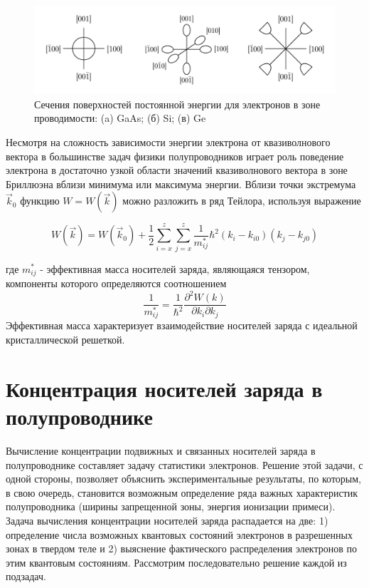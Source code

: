 \begin{figure}[h!]
	\centering
	\includegraphics[width = .95\linewidth]{img/16}
	\caption{Сечения поверхностей постоянной энергии для электронов в зоне проводимости: (a) GaAs; (б) Si; (в) Ge}
	\label{fig:1.6}
\end{figure}

Несмотря на сложность зависимости энергии электрона от квазиволнового вектора в большинстве задач физики полупроводников
играет роль поведение электрона в достаточно узкой области значений квазиволнового вектора в зоне Бриллюэна вблизи
минимума или максимума энергии. Вблизи точки экстремума $\vec{k}_0$ функцию $W=W(\vec{k})$ можно разложить в ряд Тейлора, используя
выражение

\begin{equation}
	W(\vec{k})=W\left(\vec{k}_{0}\right)+\frac{1}{2} \sum_{i=x}^{z} \sum_{j=x}^{z} \frac{1}{m_{i j}^*} \hbar^{2}\left(k_{i}-k_{i 0}\right)\left(k_{j}-k_{j 0}\right)
	\label{eq:1.7}
\end{equation}

где $m_{i j}^*$ - эффективная масса носителей заряда, являющаяся тензором, компоненты которого определяются соотношением
\begin{equation}
	\frac{1}{m^{*}_{i j}}=\frac{1}{\hbar^{2}} \frac{\partial^{2} W(k)}{\partial k_{i} \partial k_{j}}
	\label{eq:1.8}
\end{equation}
Эффективная масса характеризует взаимодействие носителей заряда с идеальной кристаллической решеткой.

\section{Концентрация носителей заряда в полупроводнике}
Вычисление концентрации подвижных и связанных носителей заряда в полупроводнике составляет задачу статистики электронов.
Решение этой задачи, с одной стороны, позволяет объяснить экспериментальные результаты, по которым, в свою очередь,
становится возможным определение ряда важных характеристик полупроводника (ширины запрещенной зоны, энергия ионизации примеси).
Задача вычисления концентрации носителей заряда распадается на две:  1) определение числа возможных квантовых состояний
электронов в разрешенных зонах в твердом теле и 2) выяснение фактического распределения электронов по этим квантовым
состояниям. Рассмотрим последовательно решение каждой из подзадач.

